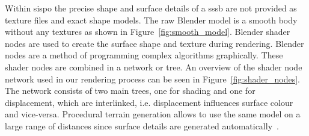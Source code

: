 \begin{table}[htb]
    \centering
    \caption{Input parameters that define an instrument in \gls{sispo}.}
    \label{tab:inst_input}
\end{table}

Within \gls{sispo} the precise shape and surface details of a \gls{sssb} are not provided as texture files and exact shape models. The raw Blender model is a smooth body without any textures as shown in Figure~\ref{fig:smooth_model}. Blender shader nodes are used to create the surface shape and texture during rendering. Blender nodes are a method of programming complex algorithms graphically. These shader nodes are combined in a network or tree. An overview of the shader node network used in our rendering process can be seen in Figure~\ref{fig:shader_nodes}. The network consists of two main trees, one for shading and one for displacement, which are interlinked, i.e. displacement influences surface colour and vice-versa. Procedural terrain generation allows to use the same model on a large range of distances since surface details are generated automatically~\cite{IntroductionNodes}.

